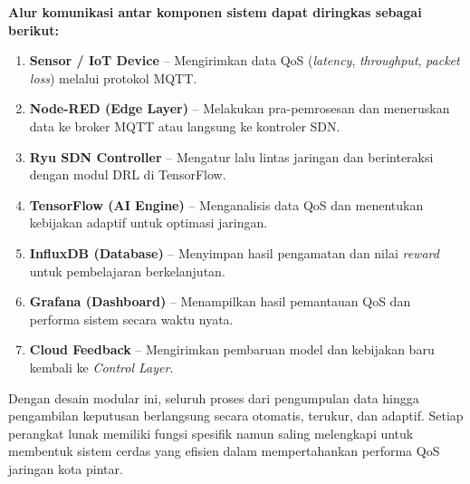\documentclass[a4paper,conference]{IEEEtran}
\begin{document}
\noindent
\textbf{Alur komunikasi antar komponen sistem dapat diringkas sebagai berikut:}
\begin{enumerate}
    \item \textbf{Sensor / IoT Device} – Mengirimkan data QoS (\textit{latency}, \textit{throughput}, \textit{packet loss}) melalui protokol MQTT.
    \item \textbf{Node-RED (Edge Layer)} – Melakukan pra-pemrosesan dan meneruskan data ke broker MQTT atau langsung ke kontroler SDN.
    \item \textbf{Ryu SDN Controller} – Mengatur lalu lintas jaringan dan berinteraksi dengan modul DRL di TensorFlow.
    \item \textbf{TensorFlow (AI Engine)} – Menganalisis data QoS dan menentukan kebijakan adaptif untuk optimasi jaringan.
    \item \textbf{InfluxDB (Database)} – Menyimpan hasil pengamatan dan nilai \textit{reward} untuk pembelajaran berkelanjutan.
    \item \textbf{Grafana (Dashboard)} – Menampilkan hasil pemantauan QoS dan performa sistem secara waktu nyata.
    \item \textbf{Cloud Feedback} – Mengirimkan pembaruan model dan kebijakan baru kembali ke \textit{Control Layer}.
\end{enumerate}

Dengan desain modular ini, seluruh proses dari pengumpulan data hingga pengambilan keputusan berlangsung secara otomatis, terukur, dan adaptif. Setiap perangkat lunak memiliki fungsi spesifik namun saling melengkapi untuk membentuk sistem cerdas yang efisien dalam mempertahankan performa QoS jaringan kota pintar.







\end{document}
